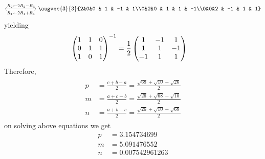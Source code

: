 \documentclass[11pt]{book}
\begin{document}
\begin{enumerate}[label=\thesection.\arabic*.,ref=\thesection.\theenumi]
\begin{align}
			\xleftrightarrow[R_1 \leftarrow 2R_1 + R_3]{R_2 \leftarrow 2R_2 - R_3}
			\augvec{3}{3}{2&0&0 & 1 & -1 & 1\\0&2&0 & 1 & 1 & -1\\0&0&2 & -1 & 1 & 1}
\end{align}
yielding
\begin{align}
			\begin{pmatrix}1&1&0\\0&1&1\\1&0&1\\\end{pmatrix}^{-1} &= 
			\frac{1}{2}\begin{pmatrix}1 & -1 & 1\\ 1 & 1 & -1\\ -1 & 1 & 1\end{pmatrix}
	\end{align}
	Therefore,
\begin{align}
\begin{split}
    p&=\frac{c+b-a}{2}
    =\frac{\sqrt{68}+\sqrt{10}-\sqrt{26}}{2}
    \\
    m&=\frac{a+c-b}{2}
    =\frac{\sqrt{26}+\sqrt{68}-\sqrt{10}}{2}
    \\
    n&=\frac{a+b-c}{2}
    =\frac{\sqrt{26}+\sqrt{10}-\sqrt{68}}{2}
\end{split}
\label{eq:incircle-mnp}
\end{align}
on solving above equations we get
\begin{align}
	p &= 3.154734699\\
	m &= 5.091476552\\
	n &= 0.007542961263
\end{align}
 

\end{enumerate}
\end{document}
